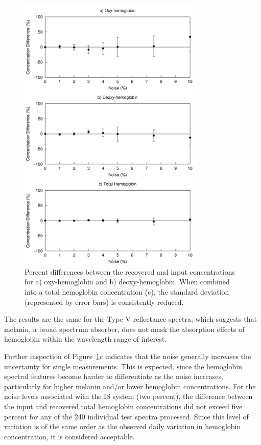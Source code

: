 \begin{figure}
	\centering \includegraphics[width=0.8\textwidth]{figures/p3-oxy_deoxy_total.png}
	\caption[Percent differences between the recovered and input hemoglobin concentrations]{\label{fig:p3-oxy_deoxy_total}Percent differences between the recovered and input concentrations for a) oxy-hemoglobin and b) deoxy-hemoglobin. When combined into a total hemoglobin concentration (c), the standard deviation (represented by error bars) is consistently reduced.}
\end{figure}

The results are the same for the Type V reflectance spectra, which suggests that melanin, a broad spectrum absorber, does not mask the absorption effects of hemoglobin within the wavelength range of interest.

Further inspection of Figure~\ref{fig:p3-oxy_deoxy_total}c indicates that the noise generally increases the uncertainty for single measurements. This is expected, since the hemoglobin spectral features become harder to differentiate as the noise increases, particularly for higher melanin and/or lower hemoglobin concentrations. For the noise levels associated with the IS system (two percent), the difference between the input and recovered total hemoglobin concentrations did not exceed five percent for any of the 240 individual test spectra processed. Since this level of variation is of the same order as the observed daily variation in hemoglobin concentration,\cite{Fullerton1996} it is considered acceptable.

